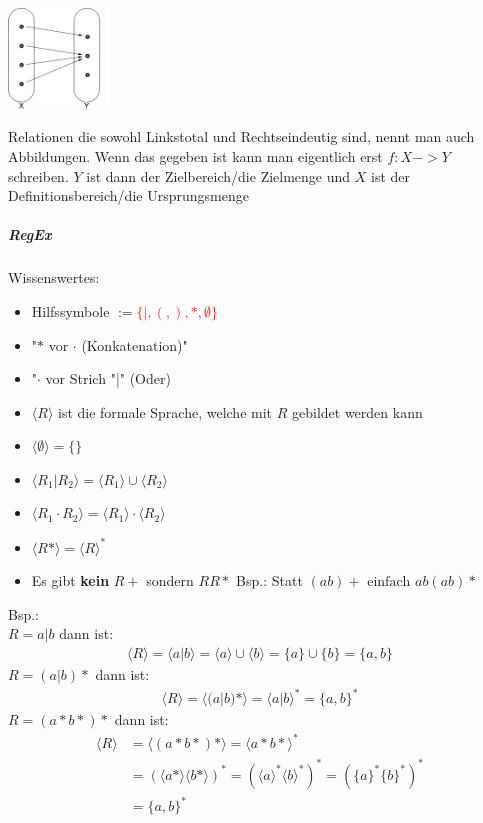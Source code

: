 \documentclass[12pt]{article}
\begin{document}
\begin{flushleft}
\begin{itemize}
        \includegraphics[width=0.2\textwidth]{linkstotal.png}
    \end{itemize}
    Relationen die sowohl Linkstotal und Rechtseindeutig sind, nennt man auch Abbildungen. Wenn das gegeben ist kann man eigentlich erst $f: X -> Y$ schreiben.
    $Y$ ist dann der Zielbereich/die Zielmenge und $X$ ist der Definitionsbereich/die Ursprungsmenge
\end{flushleft}
\subparagraph{\large RegEx}
\normalsize
\begin{flushleft}
    Wissenswertes:
    \begin{itemize}
        \item Hilfssymbole $:=$\textcolor{red}{$\{|,(,),\ast,\emptyset\}$}
        \item "$\ast$ vor $\cdot$ (Konkatenation)"
        \item "$\cdot$ vor Strich "|" (Oder)
        \item $\langle R \rangle$ ist die formale Sprache, welche mit $R$ gebildet werden kann
        \item $\langle \emptyset \rangle = \{\}$
        \item $\langle R_1| R_2 \rangle = \langle R_1 \rangle \cup \langle R_2 \rangle$
        \item $\langle R_1 \cdot R_2 \rangle =\langle R_1 \rangle \cdot \langle R_2 \rangle$
        \item $\langle R \ast \rangle = \langle R \rangle ^\ast$
        \item Es gibt \textbf{kein} $R+$ sondern $RR\ast$ Bsp.: Statt $(ab)+ \text{ einfach } ab(ab)\ast$
    \end{itemize}
    Bsp.: \\
    $R = a|b$ dann ist:
    \begin{align*}
        \langle R \rangle = \langle a | b \rangle = \langle a \rangle \cup \langle b \rangle = \{a\} \cup \{b\} = \{a,b\}
    \end{align*}
    $R = (a|b)\ast$ dann ist:
    \begin{align*}
        \langle R \rangle = \langle (a|b)\ast \rangle = \langle a | b \rangle^\ast = \{a,b\}^\ast
    \end{align*}
    $R = (a\ast b\ast)\ast$ dann ist:
    \begin{align*}
        \langle R \rangle &= \langle (a\ast b\ast)\ast \rangle = \langle a\ast b\ast\rangle^\ast \\
        &= (\langle a\ast\rangle\langle b\ast\rangle)^\ast = (\langle a\rangle^\ast\langle b\rangle^\ast)^\ast = (\{a\}^\ast\{b\}^\ast)^\ast \\
        &= \{a,b\}^\ast
    \end{align*}
\end{flushleft}
\end{document}

